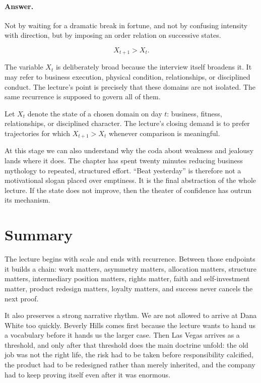\paragraph{Answer.}
Not by waiting for a dramatic break in fortune, and not by confusing intensity with direction, but by imposing an order relation on successive states.

\begin{equation}
X_{t+1} > X_t.
\end{equation}

The variable \(X_t\) is deliberately broad because the interview itself broadens it. It may refer to business execution, physical condition, relationships, or disciplined conduct. The lecture's point is precisely that these domains are not isolated. The same recurrence is supposed to govern all of them.

\begin{definition}
Let \(X_t\) denote the state of a chosen domain on day \(t\): business, fitness, relationships, or disciplined character. The lecture's closing demand is to prefer trajectories for which \(X_{t+1} > X_t\) whenever comparison is meaningful.
\end{definition}

At this stage we can also understand why the coda about weakness and jealousy lands where it does. The chapter has spent twenty minutes reducing business mythology to repeated, structured effort. ``Beat yesterday'' is therefore not a motivational slogan placed over emptiness. It is the final abstraction of the whole lecture. If the state does not improve, then the theater of confidence has outrun its mechanism.

\section{Summary}

The lecture begins with scale and ends with recurrence. Between those endpoints it builds a chain: work matters, asymmetry matters, allocation matters, structure matters, intermediary position matters, rights matter, faith and self-investment matter, product redesign matters, loyalty matters, and success never cancels the next proof.

It also preserves a strong narrative rhythm. We are not allowed to arrive at Dana White too quickly. Beverly Hills comes first because the lecture wants to hand us a vocabulary before it hands us the larger case. Then Las Vegas arrives as a threshold, and only after that threshold does the main doctrine unfold: the old job was not the right life, the risk had to be taken before responsibility calcified, the product had to be redesigned rather than merely inherited, and the company had to keep proving itself even after it was enormous.


